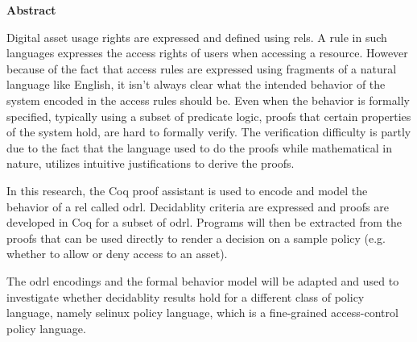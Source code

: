 
\begin{center}\textbf{Abstract}\end{center}


Digital asset usage rights are expressed and defined using \ac{rel}s. A rule in such languages expresses the access rights of users when accessing a resource. However because of the fact that access rules are expressed using fragments of a natural language like English, it isn't always clear what the intended behavior of the system encoded in the access rules should be. Even when the behavior is formally specified, typically using a subset of predicate logic, proofs that certain properties of the system hold, are hard to formally verify. The verification difficulty is partly due to the fact that the language used to do the proofs while mathematical in nature, utilizes intuitive justifications to derive the proofs. 

In this research, the Coq proof assistant is used to encode and model the behavior of a \ac{rel} called \ac{odrl}. Decidablity criteria are expressed and proofs are developed in Coq for a subset of \ac{odrl}. Programs will then be extracted from the proofs that can be used directly to render a decision on a sample policy (e.g. whether to allow or deny access to an asset). 

The \ac{odrl} encodings and the formal behavior model will be adapted and used to investigate whether decidablity results hold for a different class of policy language, namely \ac{selinux} policy language, which is a fine-grained access-control policy language.


\cleardoublepage


